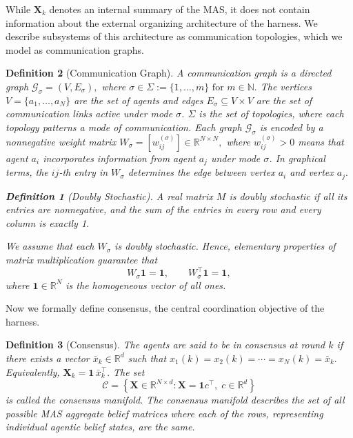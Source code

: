 \documentclass[journal,twoside,web]{ieeecolor_no_firstpage_logo}
\newtheorem{definition}{Definition}
\begin{document}
While $\mathbf{X}_k$ denotes an internal summary of the MAS, it does not contain information about the external organizing architecture of the harness. We describe subsystems of this architecture as communication topologies, which we model as communication graphs. 

\begin{definition}[Communication Graph]\label{def:commgraph}
A \emph{communication graph} is a directed graph
$
\mathcal G_\sigma=(V,E_\sigma),
$ where 
$
\sigma\in\Sigma:=\{1,\ldots,m\} \text{ for } m \in \mathbb{N}.
$
The vertices 
$
V=\{a_1,\ldots,a_N\}
$
are the set of agents and edges $E_\sigma\subseteq V\times V$ are the set of
communication links active under mode $\sigma$. $\Sigma$ is the set of topologies, where each topology patterns a mode of communication.
Each graph $\mathcal G_\sigma$ is encoded by a nonnegative weight matrix
$
W_\sigma=[w_{ij}^{(\sigma)}]\in\mathbb R^{N\times N},
$
where $w_{ij}^{(\sigma)}>0$ means that agent $a_i$ incorporates
information from agent $a_j$ under mode $\sigma$. In graphical terms, the $ij$-th entry in $W_\sigma$ determines the edge between vertex $a_i$ and vertex $a_j.$

\begin{definition}[Doubly Stochastic]\label{def:doubly stochastic}
A real matrix $M$ is doubly stochastic if all its entries are nonnegative, and the sum of the entries in every row and every column is exactly 1.
\end{definition}

We assume that each $W_\sigma$ is doubly stochastic. Hence, elementary properties of matrix multiplication guarantee that
\[
W_\sigma\mathbf{1}=\mathbf{1},
\qquad
 W_\sigma^\top \mathbf{1}=\mathbf 1,
\]
where $\mathbf 1\in\mathbb R^N$ is the homogeneous vector of all ones.
\end{definition}
Now we formally define consensus, the central coordination objective of the harness. 

\begin{definition}[Consensus]\label{def:consensus}
The agents are said to be in \emph{consensus} at round $k$ if there
exists a vector $\bar x_k\in\mathbb R^d$ such that
$
x_1(k)=x_2(k)=\cdots=x_N(k)=\bar x_k .
$
Equivalently,
$
\mathbf{X}_k=\mathbf 1\,\bar x_k^\top .
$ The set
\[
\mathcal C
=
\left\{
\mathbf{X}\in\mathbb R^{N\times d}:
\mathbf{X}=\mathbf 1 c^\top,\; c\in\mathbb R^d
\right\}
\]
is called the \emph{consensus manifold}. The consensus manifold describes the set of all possible MAS aggregate belief matrices where each of the rows, representing individual agentic belief states, are the same.
\end{definition} 
\end{document}
